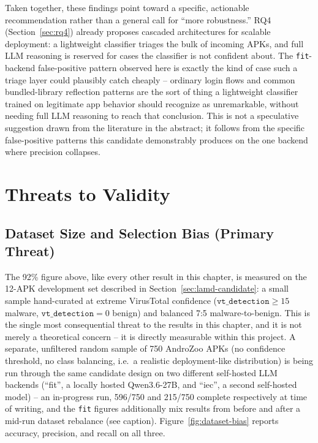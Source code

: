 Taken together, these findings point toward a specific, actionable
recommendation rather than a general call for ``more robustness.'' RQ4
(Section~\ref{sec:rq4}) already proposes cascaded architectures for
scalable deployment: a lightweight classifier triages the bulk of
incoming APKs, and full LLM reasoning is reserved for cases the classifier
is not confident about. The \texttt{fit}-backend false-positive pattern
observed here is exactly the kind of case such a triage layer could
plausibly catch cheaply -- ordinary login flows and common bundled-library
reflection patterns are the sort of thing a lightweight classifier trained
on legitimate app behavior should recognize as unremarkable, without
needing full LLM reasoning to reach that conclusion. This is not a
speculative suggestion drawn from the literature in the abstract; it
follows from the specific false-positive patterns this candidate
demonstrably produces on the one backend where precision collapses.

\section{Threats to Validity}\label{sec:threats-ch5}

\subsection{Dataset Size and Selection Bias (Primary Threat)}

The 92\% figure above, like every other result in this chapter, is measured
on the 12-APK development set described in Section~\ref{sec:lamd-candidate}:
a small sample hand-curated at extreme VirusTotal confidence
($\texttt{vt\_detection}\geq15$ malware, $\texttt{vt\_detection}=0$ benign)
and balanced 7:5 malware-to-benign. This is the single most consequential
threat to the results in this chapter, and it is not merely a theoretical
concern -- it is directly measurable within this project. A separate,
unfiltered random sample of 750 AndroZoo APKs (no confidence threshold, no
class balancing, i.e.\ a realistic deployment-like distribution) is being
run through the same candidate design on two different self-hosted LLM
backends (``fit'', a locally hosted Qwen3.6-27B, and ``iec'', a second
self-hosted model) -- an in-progress run, 596/750 and 215/750 complete
respectively at time of writing, and the \texttt{fit} figures additionally
mix results from before and after a mid-run dataset rebalance (see caption).
Figure~\ref{fig:dataset-bias} reports accuracy, precision, and recall on
all three.

